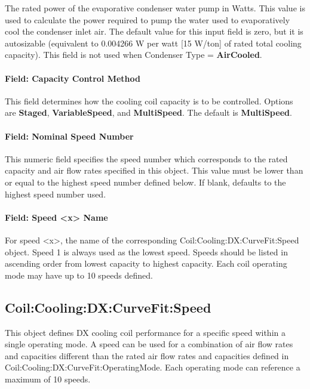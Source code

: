 The rated power of the evaporative condenser water pump in Watts. This value is used to calculate the power required to pump the water used to evaporatively cool the condenser inlet air. The default value for this input field is zero, but it is autosizable (equivalent to 0.004266 W per watt {[}15 W/ton{]} of rated total cooling capacity). This field is not used when Condenser Type = \textbf{AirCooled}.

\paragraph{Field: Capacity Control Method}\label{field-capacity-control-method}

This field determines how the cooling coil capacity is to be controlled. Options are \textbf{Staged}, \textbf{VariableSpeed}, and \textbf{MultiSpeed}. The default is \textbf{MultiSpeed}.

\paragraph{Field: Nominal Speed Number}\label{field-nominal-speed-number}

This numeric field specifies the speed number which corresponds to the rated capacity and air flow rates specified in this object. This value must be lower than or equal to the highest speed number defined below. If blank, defaults to the highest speed number used.

\paragraph{Field: Speed \textless{}x\textgreater{} Name}\label{field-speed-x-name}

For speed \textless{}x\textgreater{}, the name of the corresponding Coil:Cooling:DX:CurveFit:Speed object. Speed 1 is always used as the lowest speed. Speeds should be listed in ascending order from lowest capacity to highest capacity. Each coil operating mode may have up to 10 speeds defined.

\subsection{Coil:Cooling:DX:CurveFit:Speed}\label{coilcoolingdxcurvefitspeed}

This object defines DX cooling coil performance for a specific speed within a single operating mode. A speed can be used for a combination of air flow rates and capacities different than the rated air flow rates and capacities defined in Coil:Cooling:DX:CurveFit:OperatingMode. Each operating mode can reference a maximum of 10 speeds.

